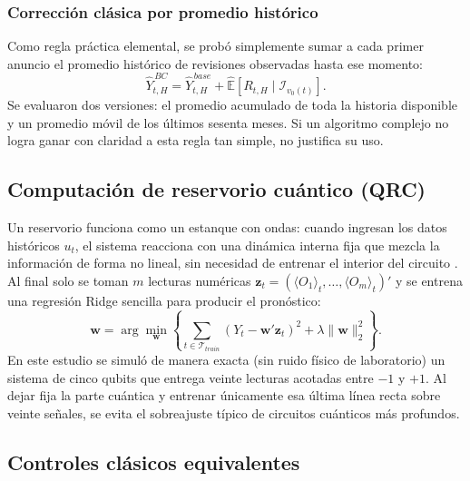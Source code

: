 \subsubsection{Corrección clásica por promedio histórico}

Como regla práctica elemental, se probó simplemente sumar a cada primer anuncio el promedio histórico de revisiones observadas hasta ese momento:
\begin{equation}
	\widehat{Y}_{t,H}^{\,BC}=\widehat{Y}_{t,H}^{\,base}+
	\widehat{\mathbb{E}}\left[R_{t,H}\mid\mathcal{I}_{v_0(t)}\right].
\end{equation}
Se evaluaron dos versiones: el promedio acumulado de toda la historia disponible y un promedio móvil de los últimos sesenta meses. Si un algoritmo complejo no logra ganar con claridad a esta regla tan simple, no justifica su uso.

\subsection{Computación de reservorio cuántico (QRC)}

Un reservorio funciona como un estanque con ondas: cuando ingresan los datos históricos \(u_t\), el sistema reacciona con una dinámica interna fija que mezcla la información de forma no lineal, sin necesidad de entrenar el interior del circuito \parencite{fujii2017}. Al final solo se toman \(m\) lecturas numéricas \(\mathbf{z}_t = (\langle O_1\rangle_t,\ldots,\langle O_m\rangle_t)'\) y se entrena una regresión Ridge sencilla para producir el pronóstico:
\begin{equation}
	\widehat{\mathbf{w}}=
	\arg\min_{\mathbf{w}}
	\left\{
	\sum_{t\in\mathcal{T}_{train}}
	(Y_t-\mathbf{w}'\mathbf{z}_t)^2+
	\lambda\|\mathbf{w}\|_2^2
	\right\}.
	\label{eq:qrc_readout}
\end{equation}
En este estudio se simuló de manera exacta (sin ruido físico de laboratorio) un sistema de cinco qubits que entrega veinte lecturas acotadas entre \(-1\) y \(+1\). Al dejar fija la parte cuántica y entrenar únicamente esa última línea recta sobre veinte señales, se evita el sobreajuste típico de circuitos cuánticos más profundos.

\subsection{Controles clásicos equivalentes}

